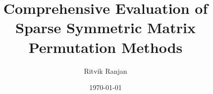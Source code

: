 \documentclass[]{iisreport}
\title{Comprehensive Evaluation of Sparse Symmetric Matrix Permutation Methods}
\author{Ritvik Ranjan}
\date{\today}
\begin{document}
\frontmatter





\tableofcontents

\mainmatter








\appendix



\backmatter


\listofacronyms

\listoffigures
\listoftables


\end{document}
